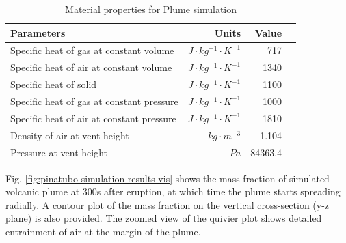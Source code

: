 \begin{table}[htp]
\centering
	\begin{centering}
      \caption{Material properties for Plume simulation}		
	  \begin{tabular}{lrrr}
	    \hline
	    Parameters & Units  & Value \\
	    \hline
	    	Specific heat of gas at constant volume     & $J \cdot kg^{-1}\cdot K^{-1}$& 717     \\
	    Specific heat of air at constant volume     & $J \cdot kg^{-1}\cdot K^{-1}$& 1340    \\
	    	Specific heat of solid                      & $J \cdot kg^{-1}\cdot K^{-1}$& 1100    \\
	    	Specific heat of gas at constant pressure   & $J \cdot kg^{-1}\cdot K^{-1}$& 1000    \\
	    	Specific heat of air at constant pressure   & $J \cdot kg^{-1}\cdot K^{-1}$& 1810    \\
	    	Density of air at vent height               & $kg \cdot m^{-3}$       & 1.104   \\
	    Pressure at vent height                        & $Pa$              & 84363.4 \\
	    \hline
	  \end{tabular}
	  \label{tab:material_properties}
	\end{centering}
\end{table}

Fig. \ref{fig:pinatubo-simulation-results-vis} shows the mass fraction of simulated volcanic plume at 300s after eruption, at which time the plume starts spreading radially. A contour plot of the mass fraction on the vertical cross-section (y-z plane) is also provided. The zoomed view of the quivier plot shows detailed entrainment of air at the margin of the plume.

